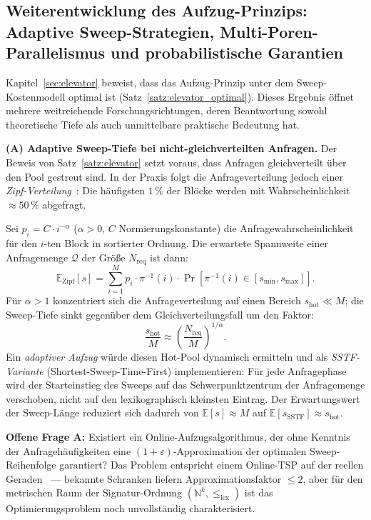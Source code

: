 ﻿\documentclass[a4paper,12pt]{article}
\theoremstyle{definition}
\theoremstyle{plain}
\begin{document}
\subsection{Weiterentwicklung des Aufzug-Prinzips: Adaptive Sweep-Strategien,
           Multi-Poren-Parallelismus und probabilistische Garantien}
\label{ssec:ausblick_elevator}

Kapitel~\ref{sec:elevator} beweist, dass das Aufzug-Prinzip unter dem
Sweep-Kostenmodell optimal ist (Satz~\ref{satz:elevator_optimal}).
Dieses Ergebnis öffnet mehrere weitreichende Forschungsrichtungen, deren
Beantwortung sowohl theoretische Tiefe als auch unmittelbare
praktische Bedeutung hat.

\textbf{(A) Adaptive Sweep-Tiefe bei nicht-gleichverteilten Anfragen.}
Der Beweis von Satz~\ref{satz:elevator} setzt voraus, dass Anfragen
gleichverteilt über den Pool gestreut sind.  In der Praxis folgt die
Anfrageverteilung jedoch einer \emph{Zipf-Verteilung}~\cite{knuth1998}:
Die häufigsten $1\,\%$ der Blöcke werden mit Wahrscheinlichkeit
$\approx 50\,\%$ abgefragt.

Sei $p_i = C \cdot i^{-\alpha}$ ($\alpha > 0$, $C$ Normierungskonstante)
die Anfragewahrscheinlichkeit für den $i$-ten Block in sortierter Ordnung.
Die erwartete Spannweite einer Anfragemenge $\mathcal{Q}$ der Größe
$N_{\mathrm{req}}$ ist dann:
\[
  \mathbb{E}_{\mathrm{Zipf}}[s]
  = \sum_{i=1}^{M} p_i \cdot \pi^{-1}(i)
    \cdot \Pr[\pi^{-1}(i) \in [s_{\min}, s_{\max}]].
\]
Für $\alpha > 1$ konzentriert sich die Anfrageverteilung auf einen
Bereich $s_{\mathrm{hot}} \ll M$; die Sweep-Tiefe sinkt gegenüber dem
Gleichverteilungsfall um den Faktor:
\[
  \frac{s_{\mathrm{hot}}}{M} \approx \left(\frac{N_{\mathrm{req}}}{M}\right)^{1/\alpha}.
\]
Ein \emph{adaptiver Aufzug} würde diesen Hot-Pool dynamisch ermitteln
und als \emph{SSTF-Variante} (Shortest-Sweep-Time-First) implementieren:
Für jede Anfragephase wird der Starteinstieg des Sweeps auf das
Schwerpunktzentrum der Anfragemenge verschoben, nicht auf den
lexikographisch kleinsten Eintrag.  Der Erwartungswert der Sweep-Länge
reduziert sich dadurch von $\mathbb{E}[s] \approx M$ auf
$\mathbb{E}[s_{\mathrm{SSTF}}] \approx s_{\mathrm{hot}}$.

\textbf{Offene Frage A:} Existiert ein Online-Aufzugsalgorithmus,
der ohne Kenntnis der Anfragehäufigkeiten eine
$(1+\varepsilon)$-Approximation der optimalen Sweep-Reihenfolge
garantiert?  Das Problem entspricht einem Online-TSP auf der reellen
Geraden~\cite{knuth1998} --- bekannte Schranken liefern
Approximationsfaktor $\le 2$, aber für den metrischen Raum der
Signatur-Ordnung $(\mathbb{N}^k, \le_{\mathrm{lex}})$ ist das
Optimierungsproblem noch unvollständig charakterisiert.
\end{document}
